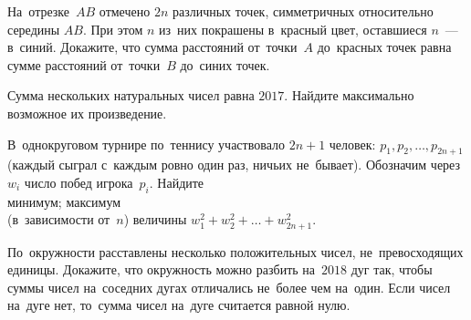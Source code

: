 \resetproblem \begingroup %
    \def\jeolmdate{3 июня 2018 г., пара 2}%
    \def\jeolmgroupname{Группа 9-3}%
    \def\jeolmauthors{Афризонов Д., Кушнир А., Тихонов~Ю.}%
\jeolmheader \endgroup


\begin{problems}

\item
На~отрезке~$AB$ отмечено $2n$ различных точек, симметричных относительно
середины $AB$.
При этом $n$ из~них покрашены в~красный цвет, оставшиеся $n$~--- в~синий.
Докажите, что сумма расстояний от~точки~$A$ до~красных точек равна сумме
расстояний от~точки~$B$ до~синих точек.

\item
Сумма нескольких натуральных чисел равна $2017$.
Найдите максимально возможное их произведение.


\item
В~однокруговом турнире по~теннису участвовало $2n+1$ человек:
$p_{1}, p_{2}, \ldots, p_{2n+1}$
(каждый сыграл с~каждым ровно один раз, ничьих не~бывает).
Обозначим через~$w_{i}$ число побед игрока~$p_{i}$.
Найдите
\\
\subproblem минимум;
\qquad
\subproblem максимум
\\
(в~зависимости от~$n$) величины
$w_{1}^2 + w_{2}^2 + \ldots + w_{2n+1}^2$.


\item
По~окружности расставлены несколько положительных чисел, не~превосходящих
единицы.
Докажите, что окружность можно разбить на~$2018$ дуг так, чтобы суммы чисел
на~соседних дугах отличались не~более чем на~один.
Если чисел на~дуге нет, то~сумма чисел на~дуге считается равной нулю.


\end{problems}
